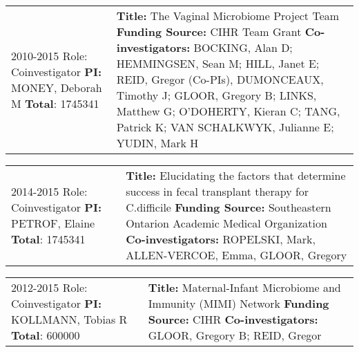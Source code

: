 \documentclass[11pt]{article}
\begin{document}
\begin{center}
\begin{tabular}{p{2.5in}p{4in}}
2010-2015 \newline 
Role: Coinvestigator
\newline \textbf{PI:} MONEY, Deborah M
\newline \textbf{Total}: 1745341
& 
\textbf{Title:} The Vaginal Microbiome Project Team \newline
\textbf{Funding Source:} CIHR Team Grant\newline
\textbf{Co-investigators:} BOCKING, Alan D; HEMMINGSEN, Sean M; HILL, Janet E; REID, Gregor (Co-PIs), DUMONCEAUX, Timothy J; GLOOR, Gregory B; LINKS, Matthew G; O'DOHERTY, Kieran C; TANG, Patrick K; VAN SCHALKWYK, Julianne E; YUDIN, Mark H \\
\end{tabular}
\end{center}

\begin{center}
\begin{tabular}{p{2.5in}p{4in}}
2014-2015 \newline 
Role: Coinvestigator
\newline \textbf{PI:} PETROF, Elaine
\newline \textbf{Total}: 1745341
& 
\textbf{Title:} Elucidating the factors that determine success in fecal transplant therapy for C.difficile \newline
\textbf{Funding Source:} Southeastern Ontarion Academic Medical Organization\newline
\textbf{Co-investigators:} ROPELSKI, Mark, ALLEN-VERCOE, Emma, GLOOR, Gregory \\
\end{tabular}
\end{center}

\begin{center}
\begin{tabular}{p{2.5in}p{4in}}
2012-2015 \newline 
Role: Coinvestigator
\newline \textbf{PI:} KOLLMANN, Tobias R
\newline \textbf{Total}: 600000
& 
\textbf{Title:} Maternal-Infant Microbiome and Immunity (MIMI) Network\newline
\textbf{Funding Source:} CIHR \newline
\textbf{Co-investigators:} GLOOR, Gregory B; REID, Gregor \\
\end{tabular}
\end{center}
	
\end{document}
